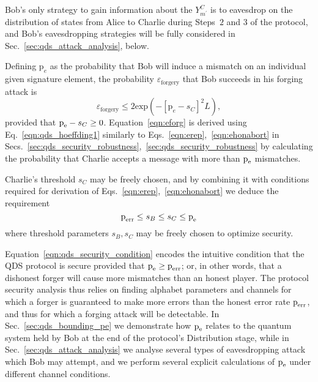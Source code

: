 Bob's only strategy to gain information about the $Y_{m^\prime}^C$ is to eavesdrop on the distribution of states from Alice to Charlie during Steps~$2$ and $3$ of the protocol, and Bob's eavesdropping strategies will be fully considered in Sec.~\ref{sec:qds_attack_analysis}, below.

Defining $\text{p}_e$ as the probability that Bob will induce a mismatch on an individual given signature element, the probability $\varepsilon_{\text{forgery}}$ that Bob succeeds in his forging attack is
\begin{equation}\label{eqn:eforg}
\varepsilon_{\text{forgery}} \le 2 \text{exp}\left( - \left[\text{p}_e - s_C\right]^2 L\right), 
\end{equation}
provided that $\text{p}_{\text{e}} - s_C \ge 0$. Equation~\ref{eqn:eforg} is derived using Eq.~\ref{eqn:qds_hoeffding1} similarly to Eqs.~\ref{eqn:erep},~\ref{eqn:ehonabort} in Secs.~\ref{sec:qds_security_robustness},~\ref{sec:qds_security_robustness} by calculating the probability that Charlie accepts a message with more than $\text{p}_{\text{e}}$ mismatches.

Charlie's threshold $s_C$ may be freely chosen, and by combining it with conditions required for derivation of Eqs.~\ref{eqn:erep},~\ref{eqn:ehonabort} we deduce the requirement
\begin{equation}\label{eqn:qds_security_condition}
\text{p}_{\text{err}} \le s_B \le s_C \le \text{p}_{\text{e}} 
\end{equation}
where threshold parameters $s_B, s_C$ may be freely chosen to optimize security. 

Equation~\ref{eqn:qds_security_condition} encodes the intuitive condition that the QDS protocol is secure provided that $\text{p}_{\text{e}} \ge \text{p}_{\text{err}}$; or, in other words, that a dishonest forger will cause more mismatches than an honest player. The protocol security analysis thus relies on finding alphabet parameters and channels for which a forger is guaranteed to make more errors than the honest error rate $\text{p}_{\text{err}}$, and thus for which a forging attack will be detectable. In Sec.~\ref{sec:qds_bounding_pe} we demonstrate how $\text{p}_{\text{e}}$ relates to the quantum system held by Bob at the end of the protocol's Distribution stage, while in Sec.~\ref{sec:qds_attack_analysis} we analyse several types of eavesdropping attack which Bob may attempt, and we perform several explicit calculations of $\text{p}_{\text{e}}$ under different channel conditions.


